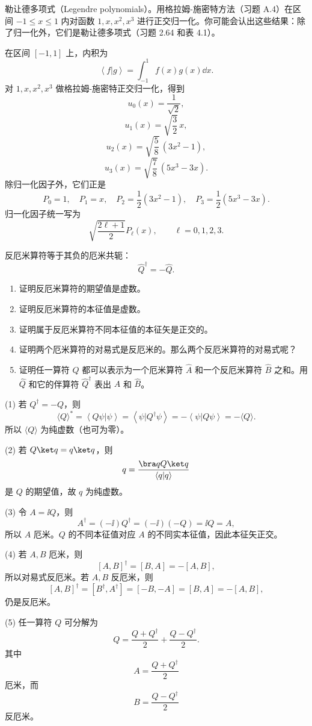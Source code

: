 \begin{question}
勒让德多项式（Legendre polynomials）。用格拉姆-施密特方法（习题 A.4）在区间 $-1\leq x\leq 1$ 内对函数 $1,x,x^2,x^3$ 进行正交归一化。你可能会认出这些结果：除了归一化外，它们是勒让德多项式（习题 2.64 和表 4.1）。
\end{question}
\begin{solution}
在区间 $[-1,1]$ 上，内积为
\[
\left\langle f|g \right\rangle=\int_{-1}^{1}f(x)g(x)\dd x.
\]
对 $1,x,x^2,x^3$ 做格拉姆-施密特正交归一化，得到
\[
u_0(x)=\frac1{\sqrt2},
\]
\[
u_1(x)=\sqrt{\frac32}\,x,
\]
\[
u_2(x)=\sqrt{\frac58}\,(3x^2-1),
\]
\[
u_3(x)=\sqrt{\frac78}\,(5x^3-3x).
\]
除归一化因子外，它们正是
\[
P_0=1,
\quad P_1=x,
\quad P_2=\frac12(3x^2-1),
\quad P_3=\frac12(5x^3-3x).
\]
归一化因子统一写为
\[
\sqrt{\frac{2\ell+1}{2}}P_\ell(x),
\qquad \ell=0,1,2,3.
\]
\end{solution}

\begin{question}
反厄米算符等于其负的厄米共轭：
\[
\hat Q^\dagger=-\hat Q.\tag{3.111}
\]
\begin{enumerate}
\item 证明反厄米算符的期望值是虚数。
\item 证明反厄米算符的本征值是虚数。
\item 证明属于反厄米算符不同本征值的本征矢是正交的。
\item 证明两个厄米算符的对易式是反厄米的。那么两个反厄米算符的对易式呢？
\item 证明任一算符 $\hat Q$ 都可以表示为一个厄米算符 $\hat A$ 和一个反厄米算符 $\hat B$ 之和。用 $\hat Q$ 和它的伴算符 $\hat Q^\dagger$ 表出 $\hat A$ 和 $\hat B$。
\end{enumerate}
\end{question}
\begin{solution}
(1) 若 $Q^\dagger=-Q$，则
\[
\langle Q\rangle^*=\left\langle Q\psi|\psi \right\rangle=\left\langle \psi|Q^\dagger\psi \right\rangle=-\left\langle \psi|Q\psi \right\rangle=-\langle Q\rangle.
\]
所以 $\langle Q\rangle$ 为纯虚数（也可为零）。

(2) 若 $Q\ket q=q\ket q$，则
\[
q=\frac{\bra qQ\ket q}{\left\langle q|q \right\rangle}
\]
是 $Q$ 的期望值，故 $q$ 为纯虚数。

(3) 令 $A=\ii Q$，则
\[
A^\dagger=(-\ii)Q^\dagger=(-\ii)(-Q)=\ii Q=A,
\]
所以 $A$ 厄米。$Q$ 的不同本征值对应 $A$ 的不同实本征值，因此本征矢正交。

(4) 若 $A,B$ 厄米，则
\[
[A,B]^\dagger=[B,A]=-[A,B],
\]
所以对易式反厄米。若 $A,B$ 反厄米，则
\[
[A,B]^\dagger=[B^\dagger,A^\dagger]=[-B,-A]=[B,A]=-[A,B],
\]
仍是反厄米。

(5) 任一算符 $Q$ 可分解为
\[
Q=\frac{Q+Q^\dagger}{2}+\frac{Q-Q^\dagger}{2}.
\]
其中
\[
\boxed{A=\frac{Q+Q^\dagger}{2}}
\]
厄米，而
\[
\boxed{B=\frac{Q-Q^\dagger}{2}}
\]
反厄米。
\end{solution}

